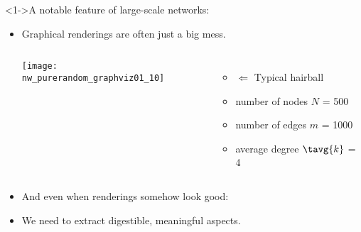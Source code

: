 \begin{frame}
  \frametitle{}

  \begin{block}<1->{A notable feature of large-scale networks:}
    \begin{itemize}
    \item<2->
      Graphical renderings are often just a big mess.
      \begin{overprint}
        \begin{columns}
          \texttt{[image: nw\_purerandom\_graphviz01\_10]}
          \begin{itemize}
          \item[] 
            $\Leftarrow$ Typical hairball
          \item 
            number of nodes $N$ = 500
          \item 
            number of edges $m$ = 1000
          \item 
            average degree $\tavg{k}$ = 4
          \end{itemize}
        \end{columns}
      \end{overprint}
    \item<4->
      And even when renderings somehow look good:\\
    \item<6-> 
      We need to extract \alert{digestible, meaningful aspects}.
    \end{itemize}
  \end{block}

\end{frame}

